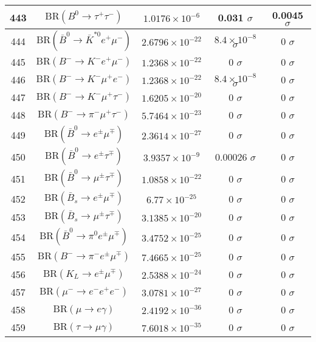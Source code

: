 \begin{longtable}{|c|c|c|c|c|}
443 &	 $\mathrm{BR}(B^0\to \tau^+\tau^-)$ &	 $1.0176\times 10^{-6}$ &	 \cellcolor{red!1}0.031 $ \sigma$ &	 0.0045 $ \sigma$ \\ \hline
444 &	 $\mathrm{BR}(\bar B^0\to \bar K^{*0} e^+\mu^-)$ &	 $2.6796\times 10^{-22}$ &	 \cellcolor{red!0}$8.4\times 10^{-8}$ $ \sigma$ &	 0 $ \sigma$ \\ \hline
445 &	 $\mathrm{BR}(B^-\to K^- e^+\mu^-)$ &	 $1.2368\times 10^{-22}$ &	 0 $ \sigma$ &	 0 $ \sigma$ \\ \hline
446 &	 $\mathrm{BR}(B^-\to K^- \mu^+e^-)$ &	 $1.2368\times 10^{-22}$ &	 \cellcolor{red!0}$8.4\times 10^{-8}$ $ \sigma$ &	 0 $ \sigma$ \\ \hline
447 &	 $\mathrm{BR}(B^-\to K^- \mu^+\tau^-)$ &	 $1.6205\times 10^{-20}$ &	 0 $ \sigma$ &	 0 $ \sigma$ \\ \hline
448 &	 $\mathrm{BR}(B^-\to \pi^- \mu^+\tau^-)$ &	 $5.7464\times 10^{-23}$ &	 0 $ \sigma$ &	 0 $ \sigma$ \\ \hline
449 &	 $\mathrm{BR}(\bar B^0\to e^\pm \mu^\mp)$ &	 $2.3614\times 10^{-27}$ &	 0 $ \sigma$ &	 0 $ \sigma$ \\ \hline
450 &	 $\mathrm{BR}(\bar B^0\to e^\pm \tau^\mp)$ &	 $3.9357\times 10^{-9}$ &	 \cellcolor{red!0}0.00026 $ \sigma$ &	 0 $ \sigma$ \\ \hline
451 &	 $\mathrm{BR}(\bar B^0\to \mu^\pm \tau^\mp)$ &	 $1.0858\times 10^{-22}$ &	 0 $ \sigma$ &	 0 $ \sigma$ \\ \hline
452 &	 $\mathrm{BR}(\bar B_s\to e^\pm \mu^\mp)$ &	 $6.77\times 10^{-25}$ &	 0 $ \sigma$ &	 0 $ \sigma$ \\ \hline
453 &	 $\mathrm{BR}(\bar B_s\to \mu^\pm \tau^\mp)$ &	 $3.1385\times 10^{-20}$ &	 0 $ \sigma$ &	 0 $ \sigma$ \\ \hline
454 &	 $\mathrm{BR}(\bar B^0\to \pi^0 e^\pm\mu^\mp)$ &	 $3.4752\times 10^{-25}$ &	 0 $ \sigma$ &	 0 $ \sigma$ \\ \hline
455 &	 $\mathrm{BR}(B^-\to \pi^- e^\pm\mu^\mp)$ &	 $7.4665\times 10^{-25}$ &	 0 $ \sigma$ &	 0 $ \sigma$ \\ \hline
456 &	 $\mathrm{BR}(K_L\to e^\pm\mu^\mp)$ &	 $2.5388\times 10^{-24}$ &	 0 $ \sigma$ &	 0 $ \sigma$ \\ \hline
457 &	 $\mathrm{BR}(\mu^-\to e^-e^+e^-)$ &	 $3.0781\times 10^{-27}$ &	 0 $ \sigma$ &	 0 $ \sigma$ \\ \hline
458 &	 $\mathrm{BR}(\mu\to e\gamma)$ &	 $2.4192\times 10^{-36}$ &	 0 $ \sigma$ &	 0 $ \sigma$ \\ \hline
459 &	 $\mathrm{BR}(\tau\to \mu\gamma)$ &	 $7.6018\times 10^{-35}$ &	 0 $ \sigma$ &	 0 $ \sigma$ \\ \hline

\end{longtable}
